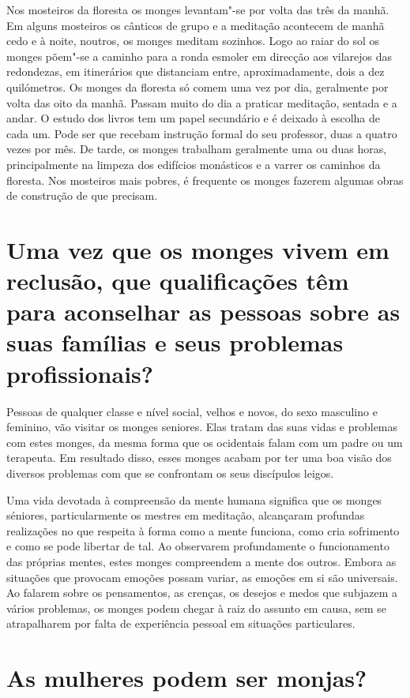 Nos mosteiros da floresta os monges levantam"-se por volta das três da
manhã. Em alguns mosteiros os cânticos de grupo e a meditação acontecem
de manhã cedo e à noite, noutros, os monges meditam sozinhos. Logo ao
raiar do sol os monges põem"-se a caminho para a ronda esmoler em
direcção aos vilarejos das redondezas, em itinerários que distanciam
entre, aproximadamente, dois a dez quilómetros. Os monges da floresta só
comem uma vez por dia, geralmente por volta das oito da manhã. Passam
muito do dia a praticar meditação, sentada e a andar. O estudo dos
livros tem um papel secundário e é deixado à escolha de cada um. Pode
ser que recebam instrução formal do seu professor, duas a quatro vezes
por mês. De tarde, os monges trabalham geralmente uma ou duas horas,
principalmente na limpeza dos edifícios monásticos e a varrer os
caminhos da floresta. Nos mosteiros mais pobres, é frequente os monges
fazerem algumas obras de construção de que precisam.

\section{Uma vez que os monges vivem em reclusão, que qualificações têm para
  aconselhar as pessoas sobre as suas famílias e seus problemas profissionais?}

Pessoas de qualquer classe e nível social, velhos e novos, do sexo
masculino e feminino, vão visitar os monges seniores. Elas tratam das
suas vidas e problemas com estes monges, da mesma forma que os
ocidentais falam com um padre ou um terapeuta. Em resultado disso, esses
monges acabam por ter uma boa visão dos diversos problemas com que se
confrontam os seus discípulos leigos.

Uma vida devotada à compreensão da mente humana significa que os monges
séniores, particularmente os mestres em meditação, alcançaram profundas
realizações no que respeita à forma como a mente funciona, como cria
sofrimento e como se pode libertar de tal. Ao observarem profundamente o
funcionamento das próprias mentes, estes monges compreendem a mente dos
outros. Embora as situações que provocam emoções possam variar, as
emoções em si são universais. Ao falarem sobre os pensamentos, as
crenças, os desejos e medos que subjazem a vários problemas, os monges
podem chegar à raiz do assunto em causa, sem se atrapalharem por falta
de experiência pessoal em situações particulares.

\section{As mulheres podem ser monjas?}


